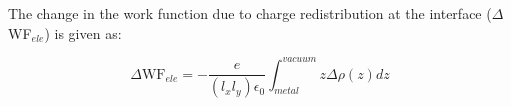 


The change in the work function due to charge redistribution at the
interface ($\Delta$WF$_{ele}$) is given as:\cite{chen2022modeling}

\begin{equation}
    \label{wf_elee}
    \Delta \textrm{WF}_{ele}  = -\frac{e}{(l_xl_y)\epsilon_0 }\int_{metal}^{vacuum} z  \Delta\rho (z)  dz
\end{equation}

